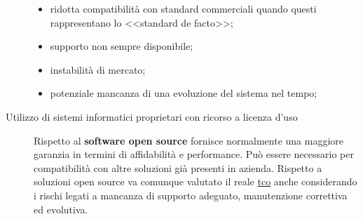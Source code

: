 \begin{description}
\begin{warning}
\begin{multicols}{2}
\begin{itemize}
                    \item ridotta compatibilità con standard commerciali quando questi rappresentano lo <<standard de facto>>;
                    \item supporto non sempre disponibile;
                    \item instabilità di mercato;
                    \item potenziale mancanza di una evoluzione del sistema nel tempo;
                \end{itemize}
            \end{multicols}
        \end{warning}
    \item[Utilizzo di sistemi informatici proprietari con ricorso a licenza d'uso] Rispetto al \textbf{software open source} fornisce normalmente una maggiore garanzia in termini di affidabilità e performance.
        Può essere necessario per compatibilità con altre soluzioni già presenti in azienda.
        Rispetto a soluzioni open source va comunque valutato il reale \hyperref[sub:ftt_total_cost_ownership]{\ac{tco}} anche considerando i rischi legati a mancanza di supporto adeguato, manutenzione correttiva ed evolutiva.
\end{description}
%
